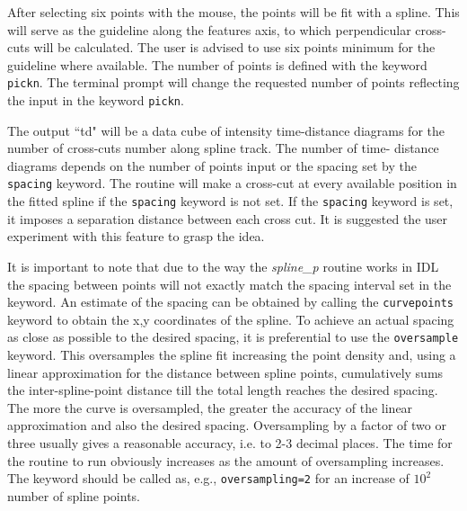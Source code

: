 \documentclass[11pt]{article}
\begin{document}
After selecting six points with the mouse, the points will be fit with a spline. This will serve as the guideline along the features axis, to which perpendicular  cross-cuts will be calculated. The user is advised to use six points minimum for the guideline where available. The number of points is defined with the keyword \texttt{pickn}. The terminal prompt will change the requested number of points reflecting the input in the keyword \texttt{pickn}.

The output ``td" will be a data cube of intensity time-distance diagrams for the number of cross-cuts number along spline track. The number of time- distance diagrams depends on the number of points input or the spacing set by the \texttt{spacing} keyword. The routine will make a cross-cut at every available position in the fitted spline if the \texttt{spacing} keyword is not set. If the \texttt{spacing} keyword is set, it imposes a separation distance between each cross cut. It is suggested the user experiment with this feature to grasp the idea.

\medskip
It is important to note that due to the way the \textit{spline\_p} routine works in IDL the spacing between points will not exactly match the spacing interval set in the keyword. An estimate of the spacing can be obtained by calling the \texttt{curvepoints} keyword to obtain the x,y coordinates of the spline. To achieve an actual spacing as close as possible to the desired spacing, it is preferential to use the \texttt{oversample} keyword. This oversamples the spline fit increasing the point density and, using a linear approximation for the distance between spline points, cumulatively sums the inter-spline-point distance till the total length reaches the desired spacing. The more the curve is oversampled, the greater the accuracy of the linear approximation and also the desired spacing. Oversampling by a factor of two or three usually gives a reasonable accuracy, i.e. to 2-3 decimal places. The time for the routine to run obviously increases as the amount of oversampling increases. The keyword should be called as, e.g., \texttt{oversampling=2} for an increase of $10^2$ number of spline points.
\end{document}
